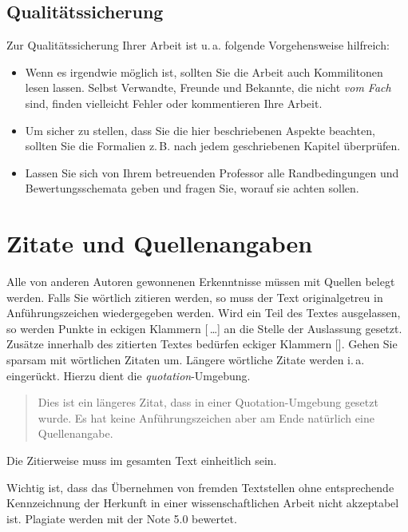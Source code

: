 \documentclass[conference,compsoc,final,a4paper]{IEEEtran}
\begin{document}
\subsection{Qualitätssicherung}
Zur Qualitätssicherung Ihrer Arbeit ist u.\,a. folgende Vorgehensweise hilfreich:
\begin{itemize}
\item Wenn es irgendwie möglich ist, sollten Sie die Arbeit auch Kommilitonen lesen lassen. Selbst Verwandte, Freunde und Bekannte, die nicht \emph{vom Fach} sind, finden vielleicht Fehler oder kommentieren Ihre Arbeit.
\item Um sicher zu stellen, dass Sie die hier beschriebenen Aspekte beachten, sollten Sie die Formalien z.\,B. nach jedem geschriebenen Kapitel überprüfen.
\item Lassen Sie sich von Ihrem betreuenden Professor alle Randbedingungen und Bewertungsschemata geben und fragen Sie, worauf sie achten sollen.
\end{itemize}



\section{Zitate und Quellenangaben}\label{quellen}
Alle von anderen Autoren gewonnenen Erkenntnisse müssen mit Quellen belegt werden. Falls Sie wörtlich zitieren werden, so muss der Text originalgetreu in Anführungszeichen wiedergegeben werden. Wird ein Teil des Textes ausgelassen, so werden Punkte in eckigen Klammern [\,\dots] an die Stelle der Auslassung gesetzt. Zusätze innerhalb des zitierten Textes bedürfen eckiger Klammern []. Gehen Sie sparsam mit wörtlichen Zitaten um. Längere wörtliche Zitate werden i.\,a. eingerückt. Hierzu dient die \textit{quotation}-Umgebung.

\begin{quotation}
Dies ist ein längeres Zitat, dass in einer Quotation-Umgebung gesetzt wurde. Es hat keine Anführungszeichen aber am Ende natürlich eine Quellenangabe.\cite{Kornmeier2011} 
\end{quotation}

Die Zitierweise muss im gesamten Text einheitlich sein.

Wichtig ist, dass das Übernehmen von fremden Textstellen ohne entsprechende Kennzeichnung der Herkunft in einer wissenschaftlichen Arbeit nicht akzeptabel ist. Plagiate werden mit der Note 5.0 bewertet.
\end{document}
